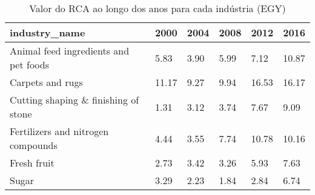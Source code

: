 \begin{table}
\centering
\caption{Valor do RCA ao longo dos anos para cada indústria (EGY)}
\begin{tabular}{p{6cm}p{1.5cm}p{1.5cm}p{1.5cm}p{1.5cm}p{1.5cm}}
\toprule
                        industry\_name &  2000 & 2004 & 2008 &  2012 &  2016 \\
\midrule
Animal feed ingredients and pet foods &  5.83 & 3.90 & 5.99 &  7.12 & 10.87 \\
                     Carpets and rugs & 11.17 & 9.27 & 9.94 & 16.53 & 16.17 \\
 Cutting shaping \& finishing of stone &  1.31 & 3.12 & 3.74 &  7.67 &  9.09 \\
   Fertilizers and nitrogen compounds &  4.44 & 3.55 & 7.74 & 10.78 & 10.16 \\
                          Fresh fruit &  2.73 & 3.42 & 3.26 &  5.93 &  7.63 \\
                                Sugar &  3.29 & 2.23 & 1.84 &  2.84 &  6.74 \\
\bottomrule
\end{tabular}
\end{table}
